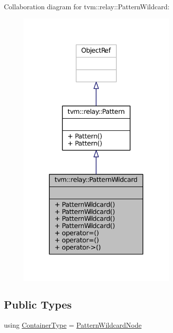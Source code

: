 Collaboration diagram for tvm\+:\+:relay\+:\+:Pattern\+Wildcard\+:
\nopagebreak
\begin{figure}[H]
\begin{center}
\leavevmode
\includegraphics[width=224pt]{classtvm_1_1relay_1_1PatternWildcard__coll__graph}
\end{center}
\end{figure}
\subsection*{Public Types}
\begin{DoxyCompactItemize}
\item 
using \hyperlink{classtvm_1_1relay_1_1PatternWildcard_a518c21bb2fb07129a3847ee37653d8ec}{Container\+Type} = \hyperlink{classtvm_1_1relay_1_1PatternWildcardNode}{Pattern\+Wildcard\+Node}
\end{DoxyCompactItemize}
